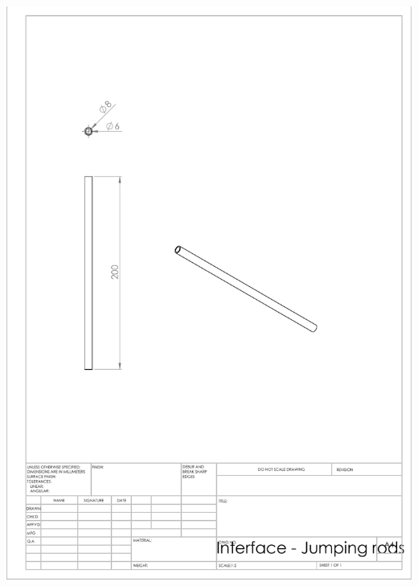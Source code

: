 \begin{appendices}
        \includegraphics[width=\linewidth]{chapters/cha_appendices/interface_jumping_rods}
        \break

\end{appendices}
